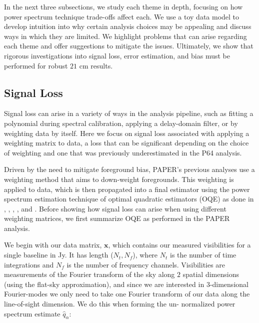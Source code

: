 \documentclass[preprint2,numberedappendix,tighten]{aastex6}  %
\begin{document}
In the next three subsections, we study each theme in depth, focusing on how power spectrum technique trade-offs affect each. 
We use a toy data model to develop intuition into why certain analysis choices may be appealing and discuss ways in which 
they are limited. We highlight problems that can arise regarding each theme and offer suggestions to mitigate the issues. 
Ultimately, we show that rigorous investigations into signal loss, error estimation, and bias must be performed for robust $21$ 
cm results.


\subsection{Signal Loss}
\label{sec:SiglossOverview}

Signal loss can arise in a variety of ways in the analysis pipeline, such as fitting a polynomial during 
spectral calibration, applying a delay-domain filter, or by weighting data by itself. Here we focus on signal loss associated with 
applying a weighting matrix to data, a loss that can be significant depending on the choice of weighting and one that was 
previously underestimated in the P64 analysis.

Driven by the need to mitigate foreground bias, PAPER's previous analyses use a weighting method that aims to down-weight 
foregrounds. This weighting is applied to data, which is then propagated into a final estimator using the power spectrum 
estimation technique of optimal quadratic estimators (OQE) as done in \citet{liu_tegmark2011}, \citet{dillon_et_al2013a}, \citet{liu_et_al2014a}, \citet{liu_et_al2014b}, and \citet{trott_et_al2012}. Before showing 
how signal loss can arise when using different weighting matrices, we first summarize OQE as performed in the PAPER 
analysis.

We begin with our data matrix, $\textbf{x}$, which contains our measured visibilities for a single baseline in Jy. It has length ($N_{t}, N_{f}$), where 
$N_{t}$ is the number of time integrations and $N_{f}$ is the number of frequency channels. Visibilities are measurements of 
the Fourier transform of the sky along $2$ spatial dimensions (using the flat-sky approximation), and since we are interested in $3$-dimensional Fourier-modes 
we only need to take one Fourier transform of our data along the line-of-sight dimension. We do this when forming the un-
normalized power spectrum estimate $\hat{q}_{\alpha}$:
\end{document}

